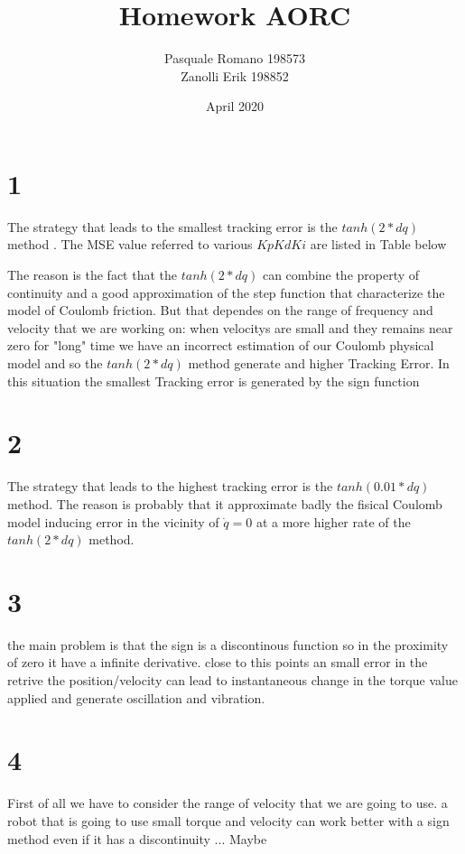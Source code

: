 \documentclass[onecolumn]{article}
\title{Homework AORC}
\author{
Pasquale Romano 198573 

Zanolli Erik 198852}
\date{April 2020}
\begin{document}
\maketitle



\section*{1}
\justify
The strategy that leads to the smallest tracking error is the $tanh(2*dq)$ method . The MSE value referred to various $Kp Kd Ki$ are listed in Table below

The reason is the fact that the $tanh(2*dq)$ can combine the property of continuity and a good approximation of the step function that characterize the model of Coulomb friction.
 But that dependes on the range of frequency and velocity that we are working on: when velocitys are small and they remains near zero for "long" time we have an incorrect estimation 
 of our Coulomb physical model and so the $tanh(2*dq)$ method generate and higher Tracking Error. In this situation the smallest Tracking error is generated by the sign function

\section*{2}
The strategy that leads to the highest tracking error is the $tanh(0.01*dq)$ method. The reason is probably that it approximate badly the fisical Coulomb model inducing error in the 
vicinity of $\dot{q}=0$ at a more higher rate of the $tanh(2*dq)$ method. 

\section*{3}
the main problem is that the sign is a discontinous function so in the proximity of zero it have a infinite derivative. close to this points an small error in the retrive the position/velocity can lead to 
instantaneous change in the torque value applied and generate oscillation and vibration.

\section*{4}
First of all we have to consider the range of velocity that we are going to use. a robot that is going to use small torque and velocity can work better with a sign method
even if it has a discontinuity ... Maybe
\end{document}

